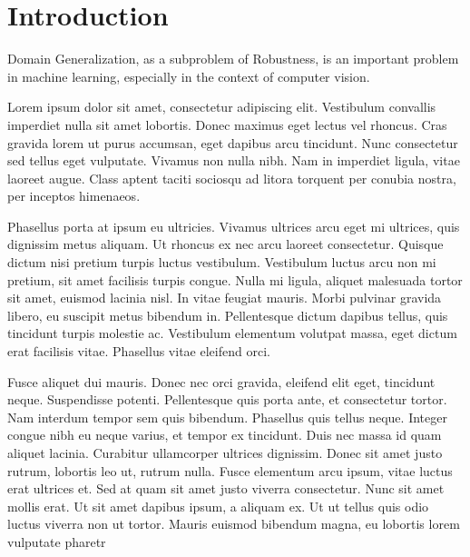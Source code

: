 \section{Introduction}

Domain Generalization, as a subproblem of Robustness, is an important problem in machine learning, especially in the context of computer vision.


Lorem ipsum dolor sit amet, consectetur adipiscing elit. Vestibulum convallis imperdiet nulla sit amet lobortis. Donec maximus eget lectus vel rhoncus. Cras gravida lorem ut purus accumsan, eget dapibus arcu tincidunt. Nunc consectetur sed tellus eget vulputate. Vivamus non nulla nibh. Nam in imperdiet ligula, vitae laoreet augue. Class aptent taciti sociosqu ad litora torquent per conubia nostra, per inceptos himenaeos.

Phasellus porta at ipsum eu ultricies. Vivamus ultrices arcu eget mi ultrices, quis dignissim metus aliquam. Ut rhoncus ex nec arcu laoreet consectetur. Quisque dictum nisi pretium turpis luctus vestibulum. Vestibulum luctus arcu non mi pretium, sit amet facilisis turpis congue. Nulla mi ligula, aliquet malesuada tortor sit amet, euismod lacinia nisl. In vitae feugiat mauris. Morbi pulvinar gravida libero, eu suscipit metus bibendum in. Pellentesque dictum dapibus tellus, quis tincidunt turpis molestie ac. Vestibulum elementum volutpat massa, eget dictum erat facilisis vitae. Phasellus vitae eleifend orci.

Fusce aliquet dui mauris. Donec nec orci gravida, eleifend elit eget, tincidunt neque. Suspendisse potenti. Pellentesque quis porta ante, et consectetur tortor. Nam interdum tempor sem quis bibendum. Phasellus quis tellus neque. Integer congue nibh eu neque varius, et tempor ex tincidunt. Duis nec massa id quam aliquet lacinia. Curabitur ullamcorper ultrices dignissim. Donec sit amet justo rutrum, lobortis leo ut, rutrum nulla. Fusce elementum arcu ipsum, vitae luctus erat ultrices et. Sed at quam sit amet justo viverra consectetur. Nunc sit amet mollis erat. Ut sit amet dapibus ipsum, a aliquam ex. Ut ut tellus quis odio luctus viverra non ut tortor. Mauris euismod bibendum magna, eu lobortis lorem vulputate pharetr
